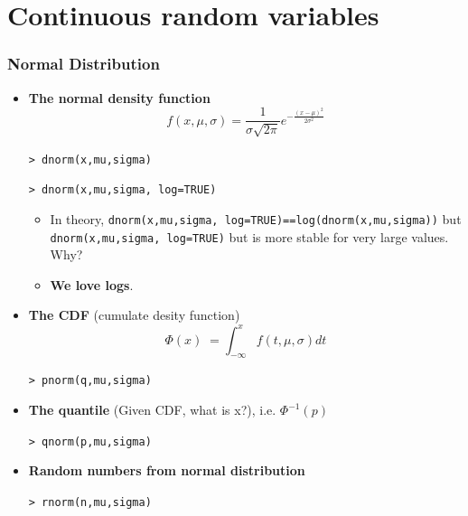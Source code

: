 \documentclass[10pt]{beamer}
\begin{document}
\section{Continuous random variables}
\begin{frame}
\frametitle{Normal Distribution}

  \begin{itemize}
  \item \textbf{The normal density function}
    \begin{equation*}
    f(x, \mu, \sigma) = \frac{1}{\sigma\sqrt{2\pi}} e^{
      -\frac{(x-\mu)^2}{2\sigma^2} }
    \end{equation*}

    \texttt{> dnorm(x,mu,sigma)}

    \texttt{> dnorm(x,mu,sigma, log=TRUE)}


    \begin{itemize}
    \item In theory, \texttt{dnorm(x,mu,sigma,
        log=TRUE)==log(dnorm(x,mu,sigma))} but
      \texttt{dnorm(x,mu,sigma, log=TRUE)} but is more stable for very
      large values. Why?

    \item \textbf{We love logs}.
    \end{itemize}

  \item \textbf{The CDF} (cumulate desity function)
    \begin{equation*}
      \Phi(x)\;=\int_{-\infty}^x f(t, \mu, \sigma) d t
    \end{equation*}

    \texttt{> pnorm(q,mu,sigma)}


  \item \textbf{The quantile} (Given CDF, what is x?),
    i.e. $\Phi^{-1}(p)$

    \texttt{> qnorm(p,mu,sigma)}


  \item \textbf{Random numbers from normal distribution}

    \texttt{> rnorm(n,mu,sigma)}
  \end{itemize}

\end{frame}
\end{document}
